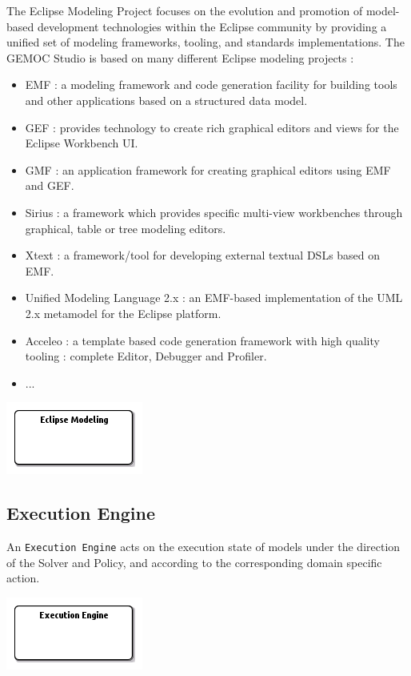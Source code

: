 \documentclass{gemoc} %
\begin{document}
The Eclipse Modeling Project focuses on the evolution and promotion of model-based development technologies within the Eclipse community by providing a unified set of modeling frameworks, tooling, and standards implementations. The GEMOC Studio is based on many different Eclipse modeling projects :
\begin{itemize}
\item EMF : a modeling framework and code generation facility for building tools and other applications based on a structured data model.
\item GEF : provides technology to create rich graphical editors and views for the Eclipse Workbench UI.
\item GMF : an application framework for creating graphical editors using EMF and GEF.
\item Sirius : a framework which provides specific multi-view workbenches through graphical, table or tree modeling editors.
\item Xtext : a framework/tool for developing external textual DSLs based on EMF.
\item Unified Modeling Language 2.x : an EMF-based implementation of the UML 2.x metamodel for the Eclipse platform.
\item Acceleo : a template based code generation framework with high quality tooling : complete Editor, Debugger and Profiler.
\item ...
\end{itemize}
\begin{center}
\includegraphics*[trim=0.0cm 0.0cm 0cm 0.0cm, clip=true]{../images/generated/Generated_Eclipse_Modeling.png}
\end{center}




\subsection{Execution Engine}
\label{sec:Execution_Engine}

An \texttt{Execution Engine} acts on the execution state of models under the direction of the Solver and Policy, and according to the corresponding domain specific action.
\begin{center}
\includegraphics*[trim=0.0cm 0.0cm 0cm 0.0cm, clip=true]{../images/generated/Generated_Execution_Engine.png}
\end{center}
\end{document}
